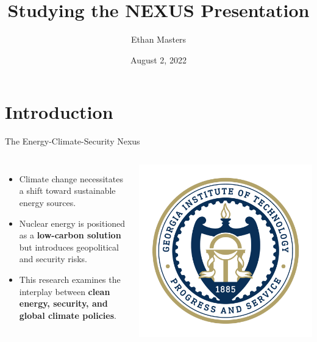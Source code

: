 \documentclass{beamer}
\title{Studying the NEXUS Presentation}
\author{Ethan Masters}
\date{August 2, 2022}
\institute{Georgia Institute of Technology}
\begin{document}
\maketitle

\frame{\tableofcontents}


\section{Introduction}
\begin{frame}{The Energy-Climate-Security Nexus}
    \begin{columns}
        \begin{itemize}
            \item Climate change necessitates a shift toward sustainable energy sources.
            \item Nuclear energy is positioned as a \textbf{low-carbon solution} but introduces geopolitical and security risks.
            \item This research examines the interplay between \textbf{clean energy, security, and global climate policies}.
        \end{itemize}
        
        \centering
        \includegraphics[width=\textwidth]{Images/gt-seal_0.png} 
    \end{columns}
\end{frame}
\end{document}
